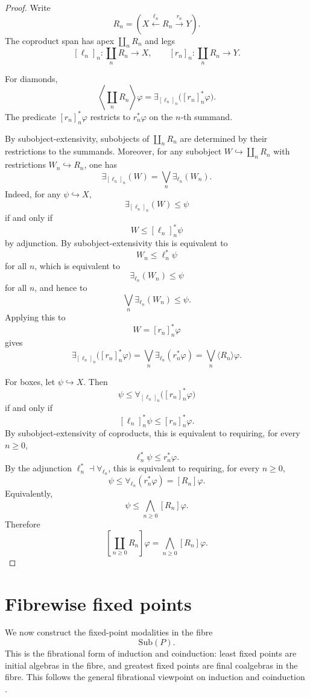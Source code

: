 \begin{proof}
Write
\[
R_n=
\left(
X\xleftarrow{\ell_n}R_n\xrightarrow{r_n}Y
\right).
\]
The coproduct span has apex \(\coprod_n R_n\) and legs
\[
[\ell_n]_n:\coprod_nR_n\to X,
\qquad
[r_n]_n:\coprod_nR_n\to Y.
\]

For diamonds,
\[
\left\langle\coprod_nR_n\right\rangle\varphi
=
\exists_{[\ell_n]_n}\bigl([r_n]_n^\ast\varphi\bigr).
\]
The predicate \([r_n]_n^\ast\varphi\) restricts to \(r_n^\ast\varphi\) on the \(n\)-th summand.

By subobject-extensivity, subobjects of \(\coprod_nR_n\) are determined by their restrictions to the summands. Moreover, for any subobject \(W\hookrightarrow \coprod_nR_n\) with restrictions \(W_n\hookrightarrow R_n\), one has
\[
\exists_{[\ell_n]_n}(W)
=
\bigvee_n\exists_{\ell_n}(W_n).
\]
Indeed, for any \(\psi\hookrightarrow X\),
\[
\exists_{[\ell_n]_n}(W)\le\psi
\]
if and only if
\[
W\le [\ell_n]_n^\ast\psi
\]
by adjunction. By subobject-extensivity this is equivalent to
\[
W_n\le \ell_n^\ast\psi
\]
for all \(n\), which is equivalent to
\[
\exists_{\ell_n}(W_n)\le \psi
\]
for all \(n\), and hence to
\[
\bigvee_n\exists_{\ell_n}(W_n)\le\psi.
\]
Applying this to
\[
W=[r_n]_n^\ast\varphi
\]
gives
\[
\exists_{[\ell_n]_n}\bigl([r_n]_n^\ast\varphi\bigr)
=
\bigvee_n\exists_{\ell_n}(r_n^\ast\varphi)
=
\bigvee_n\langle R_n\rangle\varphi.
\]

For boxes, let \(\psi\hookrightarrow X\). Then
\[
\psi\le
\forall_{[\ell_n]_n}\bigl([r_n]_n^\ast\varphi\bigr)
\]
if and only if
\[
[\ell_n]_n^\ast\psi
\le
[r_n]_n^\ast\varphi.
\]
By subobject-extensivity of coproducts, this is equivalent to requiring, for every \(n\ge0\),
\[
\ell_n^\ast\psi
\le
r_n^\ast\varphi.
\]
By the adjunction \(\ell_n^\ast\dashv \forall_{\ell_n}\), this is equivalent to requiring, for every \(n\ge0\),
\[
\psi\le
\forall_{\ell_n}(r_n^\ast\varphi)
=
[R_n]\varphi.
\]
Equivalently,
\[
\psi\le
\bigwedge_{n\ge0}[R_n]\varphi.
\]
Therefore
\[
\left[\coprod_{n\ge0}R_n\right]\varphi
=
\bigwedge_{n\ge0}[R_n]\varphi.
\]
\end{proof}

\section{Fibrewise fixed points}
\label{sec:fibrewise-fixed-points}

We now construct the fixed-point modalities in the fibre
\[
\mathrm{Sub}(P).
\]
This is the fibrational form of induction and coinduction: least fixed points are initial algebras in the fibre, and greatest fixed points are final coalgebras in the fibre. This follows the general fibrational viewpoint on induction and coinduction \cite{HermidaJacobsInductionCoinduction,HasuoChoKataokaJacobsCoinductivePredicates,ChoCoalgebraicFixedPointLogics}.

